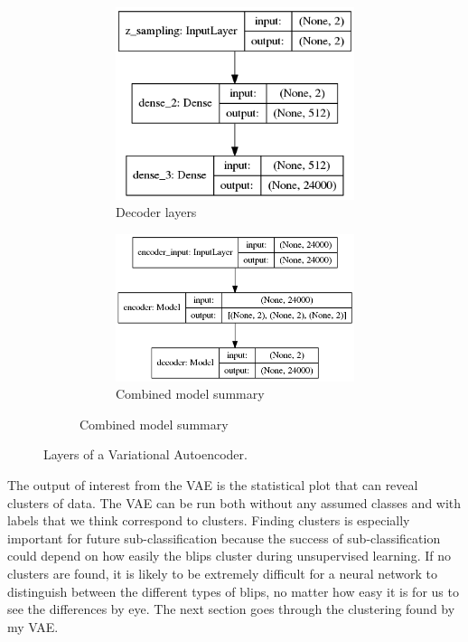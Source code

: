 \documentclass[a4paper]{article}
\begin{document}
\begin{figure}[h!]
\begin{subfigure}{.49\textwidth}
\begin{subfigure}{.6\textwidth}
			\includegraphics[width=1\linewidth]{vae_mlp_decoder}
			\caption{Decoder layers}
			\label{fig:vae_decoder}
		\end{subfigure}
		\vspace{10mm}%
		\begin{subfigure}{.8\textwidth}
			\centering
			\includegraphics[width=1\linewidth]{vae_mlp}
			\caption{Combined model summary}
			\label{fig:vae_mlp}
		\end{subfigure}
		\label{fig:decoder}
	\end{subfigure}
	
	\caption{Layers of a Variational Autoencoder.}
	\label{fig:vae}
\end{figure} 

The output of interest from the VAE is the statistical plot that can reveal clusters of data. The VAE can be run both without any assumed classes and with labels that we think correspond to clusters. Finding clusters is especially important for future sub-classification because the success of sub-classification could depend on how easily the blips cluster during unsupervised learning. If no clusters are found, it is likely to be extremely difficult for a neural network to distinguish between the different types of blips, no matter how easy it is for us to see the differences by eye. The next section goes through the clustering found by my VAE.
\end{document}
